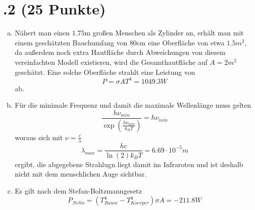 \section*{\nr.2 \tittwo (25 Punkte)}
\begin{enumerate}[(a)]
\item Nähert man einen $1.75\mathrm{m}$ großen Menschen als Zylinder an, erhält man mit einem geschätzten Bauchumfang von $80\mathrm{cm}$ eine Oberfläche von etwa $1.5m^2$, da außerdem noch extra Hautfläche durch Abweichungen von diesem vereinfachten Modell existieren, wird die Gesamthautfläche auf $A=2m^2$ geschätzt. Eine solche Oberfläche strahlt eine Leistung von 
\begin{equation}
  P=\sigma AT^4=1049.3W
\end{equation}
ab.
\item Für die minimale Frequenz und damit die maximale Wellenlänge muss gelten
\begin{equation}
\frac{h\nu_{min}}{\exp(\frac{h\nu_{min}}{k_BT})}=h\nu_{min}
\end{equation}
woraus sich mit $\nu=\frac{c}{\lambda} $
\begin{equation}
\lambda_{max}=\frac{hc}{\ln(2)k_BT}=6.69\cdot10^{-5}m
\end{equation}
ergibt, die abgegebene Strahlugn liegt damit im Infraroten und ist deshalb nicht mit dem menschlichen Auge sichtbar.
\item Es gilt nach dem Stefan-Boltzmanngesetz
\begin{equation}
  P_{Netto}=(T_{Raum}^4-T_{Koerper}^4)\sigma A=-211.8W
\end{equation}

\end{enumerate}